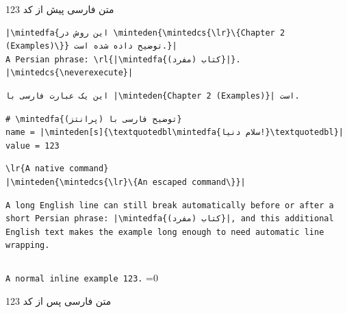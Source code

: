 \documentclass{article}
\let\listingsfa\fa
\newcounter{shouldnotrun}
\newcommand{\neverexecute}{\stepcounter{shouldnotrun}}
\newcommand{\checkmintedlanguage}[1]{%
    \edef\actualmintedlanguage{\languagename}%
    \ifdefstring{\actualmintedlanguage}{#1}{}{%
        \PackageError{unipersian-minted-test}{Language leaked: \languagename}{}%
    }%
}
\begin{document}
متن فارسی پیش از کد 123
\ifx\fa\listingsfa\else
    \PackageError{unipersian-minted-test}{The listings command was changed}{}%
\fi

\begin{verbatim}
|\mintedfa{این روش در \minteden{\mintedcs{\lr}\{Chapter 2 (Examples)\}} توضیح داده شده است.}|
A Persian phrase: \rl{|\mintedfa{کتاب (مفرد)}|}.
|\mintedcs{\neverexecute}|
\end{verbatim}

\begin{verbatim}
این یک عبارت فارسی با |\minteden{Chapter 2 (Examples)}| است.
\end{verbatim}

\begin{verbatim}
# \mintedfa{توضیح فارسی با (پرانتز)}
name = |\minteden[s]{\textquotedbl\mintedfa{سلام دنیا!}\textquotedbl}|
value = 123
\end{verbatim}

\begin{verbatim}
\lr{A native command}
|\minteden{\mintedcs{\lr}\{An escaped command\}}|
\end{verbatim}

\begin{verbatim}
A long English line can still break automatically before or after a short Persian phrase: |\mintedfa{کتاب (مفرد)}|, and this additional English text makes the example long enough to need automatic line wrapping.
\end{verbatim}

\inputminted[textlanguage=english]{python}{\jobname.py}
\texttt{A normal inline example 123.}
\ifnum\value{shouldnotrun}=0\else
    \PackageError{unipersian-minted-test}{A displayed command was executed}{}%
\fi
\ifx\fa\listingsfa\else
    \PackageError{unipersian-minted-test}{The listings command was changed}{}%
\fi
متن فارسی پس از کد 123
\end{document}
